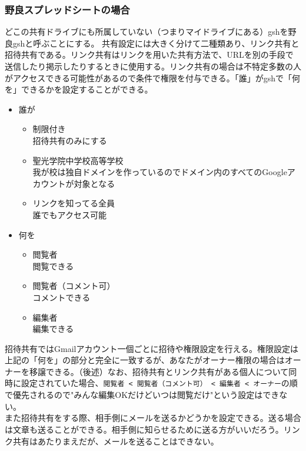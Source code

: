 \documentclass[dvipdfmx,jb5]{jreport}
\newcommand{\terlogy}[2][|]{\colorbox{terlogy}{\texttt{\lstinline#1#2#1}}}
\begin{document}
\subsubsection{野良スプレッドシートの場合}
どこの共有ドライブにも所属していない（つまりマイドライブにある）gshを野良gshと呼ぶことにする。
共有設定には大きく分けて二種類あり、リンク共有と招待共有である。リンク共有はリンクを用いた共有方法で、URLを別の手段で送信したり掲示したりするときに使用する。リンク共有の場合は不特定多数の人がアクセスできる可能性があるので条件で権限を付与できる。「誰」がgshで「何を」できるかを設定することができる。
\begin{itemize}
      \item 誰が
            \begin{itemize}
                  \item 制限付き\\
                        招待共有のみにする
                  \item 聖光学院中学校高等学校\\
                        我が校は独自ドメインを作っているのでドメイン内のすべてのGoogleアカウントが対象となる
                  \item リンクを知ってる全員\\
                        誰でもアクセス可能
            \end{itemize}
      \item 何を
            \begin{itemize}
                  \item 閲覧者\\
                        閲覧できる
                  \item 閲覧者（コメント可）\\
                        コメントできる
                  \item 編集者\\
                        編集できる
            \end{itemize}
\end{itemize}
招待共有ではGmailアカウント一個ごとに招待や権限設定を行える。権限設定は上記の「何を」の部分と完全に一致するが、あなたがオーナー権限の場合はオーナーを移譲できる。（後述）なお、招待共有とリンク共有がある個人について同時に設定されていた場合、\terlogy{閲覧者 < 閲覧者（コメント可） < 編集者 < オーナー}の順で優先されるので"みんな編集OKだけどいつは閲覧だけ"という設定はできない。
\\

また招待共有をする際、相手側にメールを送るかどうかを設定できる。送る場合は文章も送ることができる。相手側に知らせるために送る方がいいだろう。リンク共有はあたりまえだが、メールを送ることはできない。
\\
\end{document}
